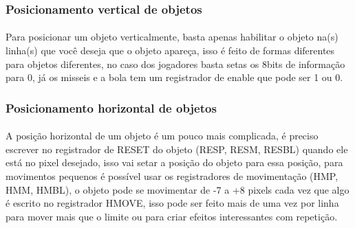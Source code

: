 \documentclass{article}
\begin{document}
\subsubsection{Posicionamento vertical de objetos}
\paragraph{}
Para posicionar um objeto verticalmente, basta apenas habilitar o objeto na(s) linha(s) que você deseja que o objeto apareça, isso é feito de formas diferentes para objetos diferentes, no caso dos jogadores basta setas os 8bits de informação para 0, já os misseis e a bola tem um registrador de enable que pode ser 1 ou 0.
\subsubsection{Posicionamento horizontal de objetos}
\paragraph{}
A posição horizontal de um objeto é um pouco mais complicada, é preciso escrever no registrador de RESET do objeto (RESP, RESM, RESBL) quando ele está no pixel desejado, isso vai setar a posição do objeto para essa posição, para movimentos pequenos é possível usar os registradores de movimentação (HMP, HMM, HMBL), o objeto pode se movimentar de -7 a +8 pixels cada vez que algo é escrito no registrador HMOVE, isso pode ser feito mais de uma vez por linha para mover mais que o limite ou para criar efeitos interessantes com repetição.



 
\end{document}
